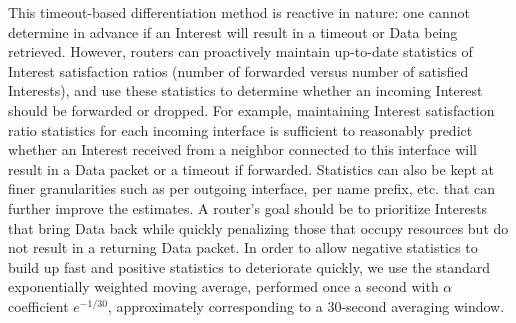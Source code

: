 \documentclass[10pt,conference]{IEEEtran}
\begin{document}
This timeout-based differentiation method is reactive in nature: one cannot determine in advance if an Interest will result in a timeout or Data being retrieved. However, routers can proactively maintain up-to-date statistics of Interest satisfaction ratios (number of forwarded versus number of satisfied Interests), and use these statistics to determine whether an incoming Interest should be forwarded or dropped. For example, maintaining Interest satisfaction ratio statistics for each incoming interface is sufficient to reasonably predict whether an Interest received from a neighbor connected to this interface will result in a Data packet or a timeout if forwarded. Statistics can also be kept at finer granularities such as per outgoing interface, per name prefix, etc. that can further improve the estimates. A router's goal should be to prioritize Interests that bring Data back while quickly penalizing those that occupy resources but do not result in a returning Data packet. In order to allow negative statistics to build up fast and positive statistics to  deteriorate quickly, we use the standard exponentially weighted moving average, performed once a second with $\alpha$ coefficient $e^{-1/30}$, approximately corresponding to a 30-second averaging window.



\end{document}

